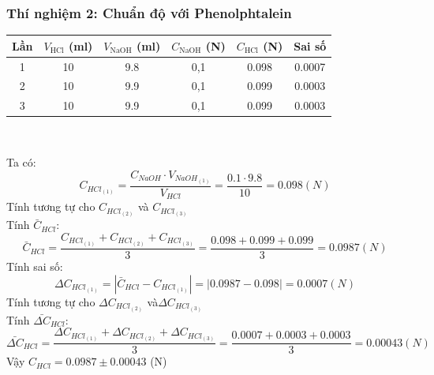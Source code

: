 \documentclass[12pt]{article}
\begin{document}
\subsubsection{Thí nghiệm 2: Chuẩn độ  với Phenolphtalein}
\begin{center}
    \begin{tabular}{|c|c|c|c|c|c|}
    \hline
    Lần & $V_\mathrm{HCl}$ (ml) & $V_\mathrm{NaOH}$ (ml) & $C_\mathrm{NaOH}$ (N) & $C_\mathrm{HCl}$ (N) & Sai số \\
    \hline
    1 & 10 & 9.8 & 0,1 & 0.098  & 0.0007  \\
    \hline
    2 & 10 & 9.9 & 0,1 & 0.099 & 0.0003\\
    \hline
    3 & 10 & 9.9 & 0,1 & 0.099 &  0.0003\\
    \hline
    \end{tabular} \\
\end{center}
Ta có: 
\[
{C_{HCl_{(1)}} = \frac{C_{NaOH} \cdot V_{NaOH_{(1)}}}{V_{HCl}} = \frac{0.1 \cdot 9.8}{10}}= 0.098 (N)
\]
Tính tương tự cho $C_{HCl_{(2)}}$ và $C_{HCl_{(3)}}$ \\
Tính $\bar{C}_{HCl}$:
\[
\bar{C}_{HCl} = \frac{C_{HCl_{(1)}} + C_{HCl_{(2)}} + C_{HCl_{(3)}}}{3} = \frac{0.098 + 0.099 + 0.099 }{3} = 0.0987(N)
\]
Tính sai số:
\[
\Delta C_{HCl_{(1)}} = \left| \bar{C}_{HCl}  -  C_{HCl_{(1)}}\right| = \left|  0.0987 - 0.098  \right| = 0.0007 ( N)
\]
Tính tương tự cho $\Delta C_{HCl_{(2)}}$ và$ \Delta C_{HCl_{(3)}}$\\
Tính $\bar{\Delta C}_{HCl}$:
\[
\bar{\Delta C}_{HCl} = \frac{\Delta C_{HCl_{(1)}} + \Delta C_{HCl_{(2)}} + \Delta C_{HCl_{(3)}}}{3} = \frac{ 0.0007 + 0.0003 + 0.0003}{3} = 0.00043(N)
\]
Vậy $C_{HCl} = 0.0987 \pm 0.00043$ (N)
\end{document}
